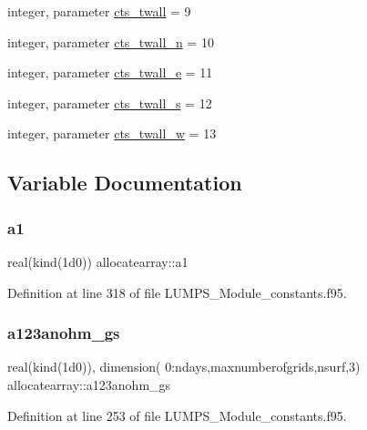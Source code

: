 \begin{DoxyCompactItemize}
\item 
integer, parameter \hyperlink{namespaceallocatearray_a2881a82b636f70de7b82aa51e82d6fb0}{cts\+\_\+twall} = 9
\item 
integer, parameter \hyperlink{namespaceallocatearray_ad25c481cef6252cfd83ea4e9d509d1b7}{cts\+\_\+twall\+\_\+n} = 10
\item 
integer, parameter \hyperlink{namespaceallocatearray_ae2581683485a569595575e0e0edffd2e}{cts\+\_\+twall\+\_\+e} = 11
\item 
integer, parameter \hyperlink{namespaceallocatearray_afbc71d1cf394bfc96dc3c764f54430b8}{cts\+\_\+twall\+\_\+s} = 12
\item 
integer, parameter \hyperlink{namespaceallocatearray_a475efb928bb522ce93cf701e18cd74f9}{cts\+\_\+twall\+\_\+w} = 13
\end{DoxyCompactItemize}


\subsection{Variable Documentation}
\mbox{\label{namespaceallocatearray_ad46985325048552753cfa81641ff8b0f}} 
\subsubsection{\texorpdfstring{a1}{a1}}
{\footnotesize\ttfamily real(kind(1d0)) allocatearray\+::a1}



Definition at line 318 of file L\+U\+M\+P\+S\+\_\+\+Module\+\_\+constants.\+f95.

\mbox{\label{namespaceallocatearray_a90def3338a21c4f1e7411ed20b48521f}} 
\subsubsection{\texorpdfstring{a123anohm\+\_\+gs}{a123anohm\_gs}}
{\footnotesize\ttfamily real(kind(1d0)), dimension( 0\+:ndays,maxnumberofgrids,nsurf,3) allocatearray\+::a123anohm\+\_\+gs}



Definition at line 253 of file L\+U\+M\+P\+S\+\_\+\+Module\+\_\+constants.\+f95.


